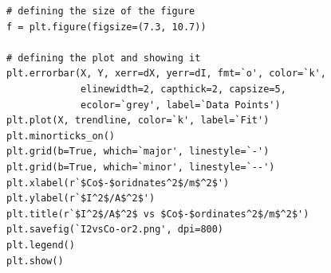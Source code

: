 \documentclass[12pt, a4paper]{article}
\begin{document}
\begin{lstlisting}
# defining the size of the figure
f = plt.figure(figsize=(7.3, 10.7))

# defining the plot and showing it
plt.errorbar(X, Y, xerr=dX, yerr=dI, fmt=`o', color=`k', 
             elinewidth=2, capthick=2, capsize=5,
             ecolor=`grey', label=`Data Points')
plt.plot(X, trendline, color=`k', label=`Fit')
plt.minorticks_on()
plt.grid(b=True, which=`major', linestyle=`-')
plt.grid(b=True, which=`minor', linestyle=`--')
plt.xlabel(r`$Co$-$oridnates^2$/m$^2$')
plt.ylabel(r`$I^2$/A$^2$')
plt.title(r`$I^2$/A$^2$ vs $Co$-$ordinates^2$/m$^2$')
plt.savefig(`I2vsCo-or2.png', dpi=800)
plt.legend()
plt.show()
\end{lstlisting}
\end{document}
